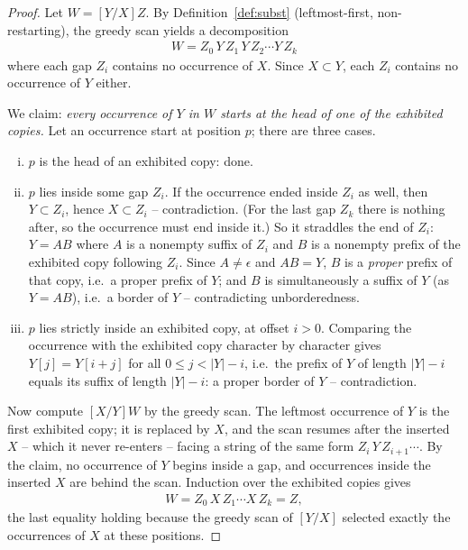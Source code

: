 \documentclass[runningheads,envcountsect]{llncs}
\begin{document}
\begin{proof}
    Let $W = [Y/X]Z$. By Definition~\ref{def:subst} (leftmost-first, non-restarting), the greedy scan yields a decomposition
    \begin{align}
        W = Z_0\,Y\,Z_1\,Y\,Z_2\cdots Y\,Z_k
    \end{align}
    where each gap $Z_i$ contains no occurrence of $X$. Since $X\subset Y$, each $Z_i$ contains no occurrence of $Y$ either.

    We claim: \emph{every occurrence of $Y$ in $W$ starts at the head of one of the exhibited copies.} Let an occurrence start at position $p$; there are three cases.
    \begin{enumerate}[(i)]
        \item $p$ is the head of an exhibited copy: done.
        \item $p$ lies inside some gap $Z_i$. If the occurrence ended inside $Z_i$ as well, then $Y\subset Z_i$, hence $X \subset Z_i$ -- contradiction. (For the last gap $Z_k$ there is nothing after, so the occurrence must end inside it.) So it straddles the end of $Z_i$: $Y = AB$ where $A$ is a nonempty suffix of $Z_i$ and $B$ is a nonempty prefix of the exhibited copy following $Z_i$. Since $A\neq\epsilon$ and $AB = Y$, $B$ is a \emph{proper} prefix of that copy, i.e.\ a proper prefix of $Y$; and $B$ is simultaneously a suffix of $Y$ (as $Y = AB$), i.e.\ a border of $Y$ -- contradicting unborderedness.
        \item $p$ lies strictly inside an exhibited copy, at offset $i>0$. Comparing the occurrence with the exhibited copy character by character gives $Y[j] = Y[i+j]$ for all $0\le j < |Y|-i$, i.e.\ the prefix of $Y$ of length $|Y|-i$ equals its suffix of length $|Y|-i$: a proper border of $Y$ -- contradiction.
    \end{enumerate}
    Now compute $[X/Y]W$ by the greedy scan. The leftmost occurrence of $Y$ is the first exhibited copy; it is replaced by $X$, and the scan resumes after the inserted $X$ -- which it never re-enters -- facing a string of the same form $Z_i\,Y\,Z_{i+1}\cdots$. By the claim, no occurrence of $Y$ begins inside a gap, and occurrences inside the inserted $X$ are behind the scan. Induction over the exhibited copies gives
    \begin{align}
        [X/Y]W = Z_0\,X\,Z_1\cdots X\,Z_k = Z,
    \end{align}
    the last equality holding because the greedy scan of $[Y/X]$ selected exactly the occurrences of $X$ at these positions.
\end{proof}
\end{document}
